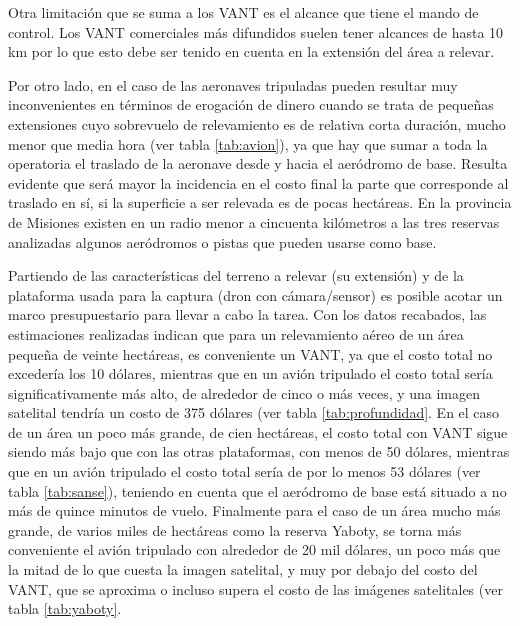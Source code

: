 Otra limitación que se suma a los VANT es el alcance que tiene el mando de control. Los VANT comerciales más difundidos suelen tener alcances de hasta 10 km \cite{noauthor_dji_nodate} por lo que esto debe ser tenido en cuenta en la extensión del área a relevar.

Por otro lado, en el caso de las aeronaves tripuladas pueden resultar muy inconvenientes en términos de erogación de dinero cuando se trata de pequeñas extensiones cuyo sobrevuelo de relevamiento es de relativa corta duración, mucho menor que media hora (ver tabla \ref{tab:avion}), ya que hay que sumar a toda la operatoria el traslado de la aeronave desde y hacia el aeródromo de base. Resulta evidente que será mayor la incidencia en el costo final la parte que corresponde al traslado en sí, si la superficie a ser relevada es de pocas hectáreas. En la provincia de Misiones existen en un radio menor a cincuenta kilómetros a las tres reservas analizadas algunos aeródromos o pistas que pueden usarse como base.


Partiendo de las características del terreno a relevar (su extensión) y de la plataforma usada para la captura (dron con cámara/sensor) es posible acotar un marco presupuestario para llevar a cabo la tarea. Con los datos recabados, las estimaciones realizadas indican que para un relevamiento aéreo de un área pequeña de veinte hectáreas, es conveniente un VANT, ya que el costo total no excedería los 10 dólares, mientras que en un avión tripulado el costo total sería significativamente más alto, de alrededor de cinco o más veces, y una imagen satelital tendría un costo de 375 dólares (ver tabla \ref{tab:profundidad}. En el caso de un área un poco más grande, de cien hectáreas, el costo total con VANT sigue siendo más bajo que con las otras plataformas, con menos de 50 dólares, mientras que en un avión tripulado el costo total sería de por lo menos 53 dólares (ver tabla \ref{tab:sanse}), teniendo en cuenta que el aeródromo de base está situado a no más de quince minutos de vuelo. Finalmente para el caso de un área mucho más grande, de varios miles de hectáreas como la reserva Yaboty, se torna más conveniente el avión tripulado con alrededor de 20 mil dólares, un poco más que la mitad de lo que cuesta la imagen satelital, y muy por debajo del costo del VANT, que se aproxima o incluso supera el costo de las imágenes satelitales (ver tabla \ref{tab:yaboty}.


